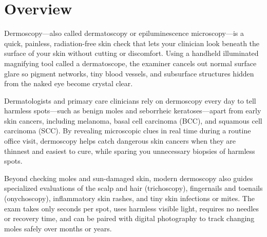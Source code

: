 \label{ch:infographic-dermoscopy}

\section{Overview}

Dermoscopy---also called dermatoscopy or epiluminescence microscopy---is a quick, painless, radiation-free skin check that lets your clinician look beneath the surface of your skin without cutting or discomfort. Using a handheld illuminated magnifying tool called a dermatoscope, the examiner cancels out normal surface glare so pigment networks, tiny blood vessels, and subsurface structures hidden from the naked eye become crystal clear.

Dermatologists and primary care clinicians rely on dermoscopy every day to tell harmless spots---such as benign moles and seborrheic keratoses---apart from early skin cancers, including melanoma, basal cell carcinoma (BCC), and squamous cell carcinoma (SCC). By revealing microscopic clues in real time during a routine office visit, dermoscopy helps catch dangerous skin cancers when they are thinnest and easiest to cure, while sparing you unnecessary biopsies of harmless spots.

Beyond checking moles and sun-damaged skin, modern dermoscopy also guides specialized evaluations of the scalp and hair (trichoscopy), fingernails and toenails (onychoscopy), inflammatory skin rashes, and tiny skin infections or mites. The exam takes only seconds per spot, uses harmless visible light, requires no needles or recovery time, and can be paired with digital photography to track changing moles safely over months or years.

